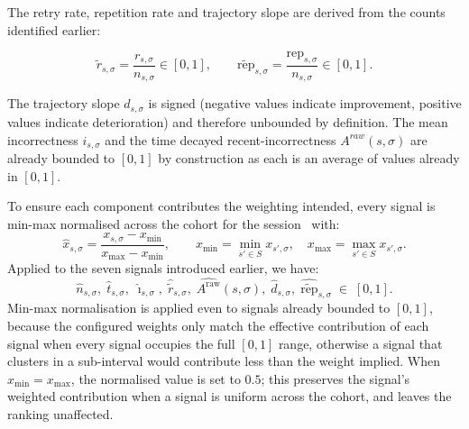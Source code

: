 The retry rate, repetition rate and trajectory slope are derived from the counts identified earlier:

\begin{equation*}
    \tilde{r}_{s,\sigma} = \frac{r_{s,\sigma}}{n_{s,\sigma}} \in [0,1], \qquad
    \tilde{\mathrm{rep}}_{s,\sigma} = \frac{\mathrm{rep}_{s,\sigma}}{n_{s,\sigma}} \in [0,1].
\end{equation*}

The trajectory slope $d_{s,\sigma}$ is signed (negative values indicate improvement, positive values indicate deterioration) and therefore unbounded by definition. The mean incorrectness $i_{s,\sigma}$ and the time decayed recent-incorrectness $A^{raw}(s,\sigma)$ are already bounded to $[0,1]$ by construction as each is an average of values already in $[0,1]$.

To ensure each component contributes the weighting intended, every signal is min-max normalised across the cohort for the session~\cite{oecdHandbookConstructingComposite2008} with:
\begin{equation*}
    \hat{x}_{s,\sigma}
    = \frac{x_{s,\sigma} - x_{\min}}{x_{\max} - x_{\min}},
    \qquad
    x_{\min} = \min_{s' \in S} x_{s',\sigma}, \quad
    x_{\max} = \max_{s' \in S} x_{s',\sigma}.
\end{equation*}
Applied to the seven signals introduced earlier, we have:
\begin{equation*}
    \hat{n}_{s,\sigma},\;
    \hat{t}_{s,\sigma},\;
    \hat{\imath}_{s,\sigma},\;
    \hat{\tilde{r}}_{s,\sigma},\;
    \widehat{A^{\mathrm{raw}}}(s,\sigma),\;
    \hat{d}_{s,\sigma},\;
    \widehat{\tilde{\mathrm{rep}}}_{s,\sigma}
    \;\in\; [0,1].
\end{equation*}
Min-max normalisation is applied even to signals already bounded to $[0,1]$, because the configured weights only match the effective contribution of each signal when every signal occupies the full $[0,1]$ range, otherwise a signal that clusters in a sub-interval would contribute less than the weight implied. 
When $x_{\min} = x_{\max}$, the normalised value is set to $0.5$; this preserves the signal's weighted contribution when a signal is uniform across the cohort, and leaves the ranking unaffected.



